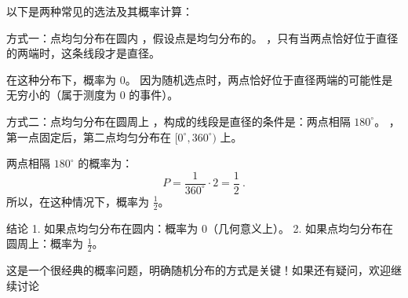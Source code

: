以下是两种常见的选法及其概率计算：

方式一：点均匀分布在圆内
，假设点是均匀分布的。
，只有当两点恰好位于直径的两端时，这条线段才是直径。

在这种分布下，概率为 0。
因为随机选点时，两点恰好位于直径两端的可能性是无穷小的（属于测度为 0 的事件）。

方式二：点均匀分布在圆周上
，构成的线段是直径的条件是：两点相隔 $180^\circ$。
，第一点固定后，第二点均匀分布在 $[0^\circ, 360^\circ)$ 上。

两点相隔 $180^\circ$ 的概率为：
$$
P = \frac{1}{360^\circ} \cdot 2 = \frac{1}{2}~.
$$
所以，在这种情况下，概率为 $\frac{1}{2}$。

结论
	1.	如果点均匀分布在圆内：概率为 $0$（几何意义上）。
	2.	如果点均匀分布在圆周上：概率为 $\frac{1}{2}$。

这是一个很经典的概率问题，明确随机分布的方式是关键！如果还有疑问，欢迎继续讨论~